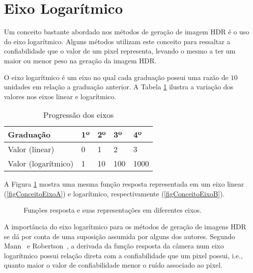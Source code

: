 \section{Eixo Logarítmico} \label{conceitoGaussiana}

	Um conceito bastante abordado nos métodos de geração de imagem HDR é o uso do eixo logarítmico. Alguns métodos utilizam este conceito para ressaltar a confiabilidade que o valor de um pixel representa, levando o mesmo a ter um maior ou menor peso na geração da imagem HDR.
	
	O eixo logarítmico é um eixo no qual cada graduação possui uma razão de $10$ unidades em relação a graduação anterior. A Tabela \ref{tabConceitosEixo} ilustra a variação dos valores nos eixos linear e logarítmico.
	
\begin{table}[H]
  \centering
  \caption{Progressão dos eixos}
  \label{tabConceitosEixo}
  \begin{tabular}{l|l|l|l|l}
    \hline
    Graduação           & 1º & 2º & 3º  & 4º   \\
    \hline
    Valor (linear)      & 0  & 1  & 2   & 3    \\
    \hline
    Valor (logarítmico) & 1  & 10 & 100 & 1000 \\  
    \hline
  \end{tabular}
\end{table}
	
	A Figura \ref{figConceitoEixo} mostra uma mesma função resposta representada em um eixo linear (\ref{figConceitoEixoA}) e logarítmico, respectivamente (\ref{figConceitoEixoB}).
	
\begin{figure}[H]
  \centering
  \quad %
  \caption{Funções resposta e suas representações em diferentes eixos.}
  \label{figConceitoEixo}
\end{figure}

	A importância do eixo logarítmico para os métodos de geração de imagens HDR se dá por conta de uma suposição assumida por alguns dos autores. Segundo Mann~\cite{mann} e Robertson~\cite{robertson}, a derivada da função resposta da câmera num eixo logarítmico possui relação direta com a confiabilidade que um pixel possui, i.e., quanto maior o valor de confiabilidade menor o ruído associado ao pixel. %
	

